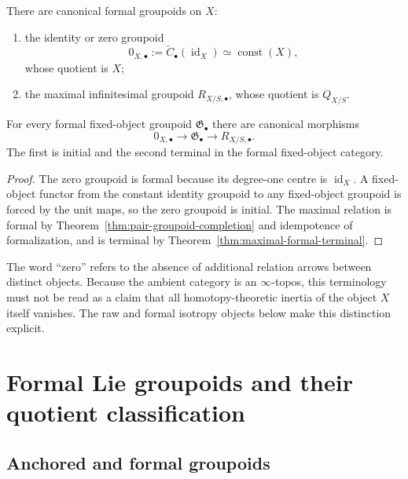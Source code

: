 \begin{proposition}
\label{prop:extremal-infinitesimal-groupoids}
There are canonical formal groupoids on $X$:
\begin{enumerate}
    \item the identity or zero groupoid
    \[
        0_{X,\bullet}
        :=
        \check C_\bullet(\operatorname{id}_X)
        \simeq
        \operatorname{const}(X),
    \]
    whose quotient is $X$;
    \item the maximal infinitesimal groupoid
    $R_{X/S,\bullet}$, whose quotient is $Q_{X/S}$.
\end{enumerate}
For every formal fixed-object groupoid $\mathfrak G_\bullet$ there are
canonical morphisms
\[
    0_{X,\bullet}
    \longrightarrow
    \mathfrak G_\bullet
    \longrightarrow
    R_{X/S,\bullet}.
\]
The first is initial and the second terminal in the formal fixed-object
category.
\end{proposition}

\begin{proof}
The zero groupoid is formal because its degree-one centre is
$\operatorname{id}_X$.  A fixed-object functor from the constant identity
groupoid to any fixed-object groupoid is forced by the unit maps, so the zero
groupoid is initial.  The maximal relation is formal by
Theorem~\ref{thm:pair-groupoid-completion} and idempotence of formalization,
and is terminal by Theorem~\ref{thm:maximal-formal-terminal}.
\end{proof}

\begin{remark}
The word ``zero'' refers to the absence of additional relation arrows between
distinct objects.  Because the ambient category is an $\infty$-topos, this
terminology must not be read as a claim that all homotopy-theoretic inertia of
the object $X$ itself vanishes.  The raw and formal isotropy objects below
make this distinction explicit.
\end{remark}


\section{Formal Lie groupoids and their quotient classification}
\label{sec:flg-definition-classification}

\subsection{Anchored and formal groupoids}

